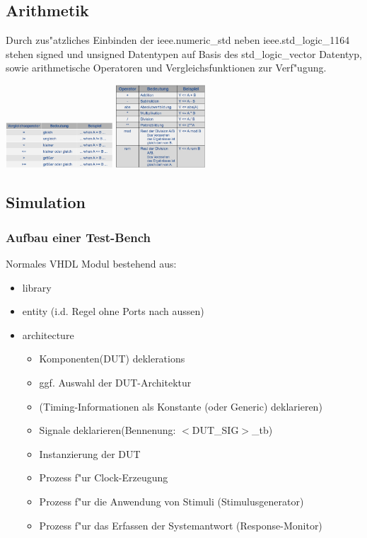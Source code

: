 \begin{multicols}{2}
			\subsection{Arithmetik}
					Durch zus"atzliches Einbinden der ieee.numeric\_std neben ieee.std\_logic\_1164  	
					stehen signed und unsigned Datentypen auf Basis des std\_logic\_vector Datentyp, 
					sowie arithmetische Operatoren und Vergleichsfunktionen zur Verf"ugung.
			\begin{center}
					\includegraphics[width=0.3\textwidth]{pics/arithvergleich}
					\includegraphics[width=0.25\textwidth]{pics/arithoperator}
			\end{center}
	\end{multicols}

	\subsection{Simulation}
		\subsubsection{Aufbau einer Test-Bench}
			\begin{multicols}{2}
				Normales VHDL Modul bestehend aus:
				\begin{itemize}
					\item library
					\item entity (i.d. Regel ohne Ports nach aussen)
					\item architecture
						\begin{itemize}
							\item Komponenten(DUT) deklerations
							\item ggf. Auswahl der DUT-Architektur
							\item (Timing-Informationen als Konstante (oder 
								Generic) deklarieren)
							\item Signale deklarieren(Bennenung: $<$DUT\_SIG$>$\_tb)
							\item Instanzierung der DUT
							\item Prozess f"ur Clock-Erzeugung
							\item Prozess f"ur die Anwendung von Stimuli 
								(Stimulusgenerator)
							\item Prozess f"ur das Erfassen der Systemantwort 
								(Response-Monitor)
						\end{itemize}
				\end{itemize}
			\end{multicols}

